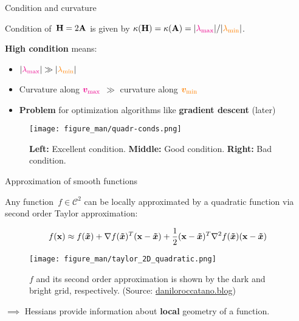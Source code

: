 \documentclass[11pt,compress,t,notes=noshow, xcolor=table]{beamer}
\begin{document}
\begin{vbframe}{Condition and curvature}

Condition of~$\mathbf{H} = 2\mathbf{A}$ is given by $\kappa(\mathbf{H}) = \kappa(\mathbf{A}) = |\textcolor{magenta}{\lambda_\text{max}}| / |\textcolor{orange}{\lambda_\text{min}}|$.

\vspace{\baselineskip}

\textbf{High condition} means: 

\begin{itemize}
    \item $|\textcolor{magenta}{\lambda_\text{max}}| \gg |\textcolor{orange}{\lambda_\text{min}}|$
    \item Curvature along $\textcolor{magenta}{\bm{v}_\text{max}}$ $\gg$ curvature along $\textcolor{orange}{\bm{v}_\text{min}}$
    \item \textbf{Problem} for optimization algorithms like \textbf{gradient descent} (later)
\end{itemize}

\begin{figure}
    \centering
    \texttt{[image: figure\_man/quadr-conds.png]}
    \caption*{\footnotesize \textbf{Left:} Excellent condition. \textbf{Middle:} Good condition. \textbf{Right:} Bad condition.}
\end{figure}

\end{vbframe}

\begin{vbframe}{Approximation of smooth functions}

Any function~$f \in \mathcal{C}^2$ can be locally approximated by a quadratic function via second order Taylor approximation: 

\vspace*{-0.5\baselineskip}

\begin{equation*}
    f(\mathbf{x}) \approx f(\bm{\tilde{x}}) + \nabla f(\bm{\tilde{x}})^T(\mathbf{x}-\bm{\tilde{x}}) + \frac 12(\mathbf{x}-\bm{\tilde{x}})^T\nabla^2 f(\bm{\tilde{x}})(\mathbf{x}-\bm{\tilde{x}})    
\end{equation*}

\vspace{-0.5\baselineskip}

\begin{figure}
    \texttt{[image: figure\_man/taylor\_2D\_quadratic.png]}
    \caption*{\footnotesize $f$ and its second order approximation is shown by the dark and bright grid, respectively.
        (Source: \url{daniloroccatano.blog})}
\end{figure}

$\implies$ Hessians provide information about \textbf{local} geometry of a function.

\end{vbframe}
  
\endlecture
\end{document}
